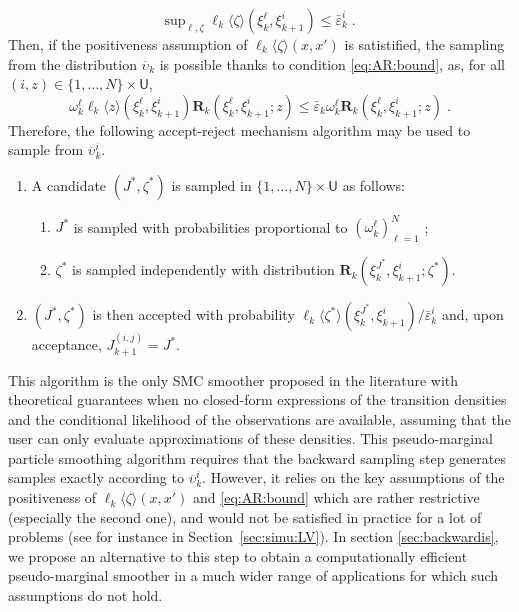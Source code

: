 \documentclass{article}
\newcommand{\N}{N}
\newcommand{\hkup}{\bar{\varepsilon}}
\newcommand{\bi}[3]{J_{#1}^{(#2, #3)}}
\newcommand{\eqsp}{\;}
\newcommand{\ewght}[2]{\ensuremath{\omega_{#1}^{#2}}}
\newcommand{\epart}[2]{\ensuremath{\xi_{#1}^{#2}}}
\newcommand{\marginalset}{\mathsf{U}}
\newcommand{\kernelmarg}{\mathbf{R}}
\newcommand{\qg}[1]{\ell_{#1}}
\newcommand{\hatqg}[1]{\mathsf{\ell}_{#1}}
\begin{document}
\begin{equation}
\mathrm{sup}_{\ell,\zeta}\;\hatqg{k}\langle \zeta\rangle(\epart{k}{\ell},\epart{k+1}{i})\leqslant \hkup^i_k\eqsp. \label{eq:AR:bound}
\end{equation}
Then,  if the positiveness assumption of  $\hatqg{k}\langle \zeta\rangle(x, x')$ is satistified, the sampling from the distribution $\overline\upsilon_k$ is possible thanks to condition \eqref{eq:AR:bound}, as, for all $(i, z) \in \lbrace 1,\dots,N\rbrace\times\marginalset$, 
$$
\ewght{k}{\ell}\hatqg{k}\langle z \rangle(\epart{k}{\ell},\epart{k+1}{i})\kernelmarg_{k}(\epart{k}{\ell},\epart{k+1}{i};z) \leqslant \hkup_k \ewght
{k}{\ell} \kernelmarg_{k}(\epart{k}{\ell},\epart{k+1}{i};z)\eqsp. 
$$
Therefore, the following  accept-reject mechanism algorithm may be used to sample from $\overline \upsilon_k^i$.
\begin{enumerate}
\item A candidate $(J^\ast,\zeta^\ast)$ is sampled in $\{1,\ldots, \N\}\times\marginalset$ as follows: 
\begin{enumerate}
\item $J^\ast$ is sampled with probabilities proportional to  $(\ewght{k}{\ell})_{\ell=1}^{\N}$ ;
\item $\zeta^\ast$ is sampled independently with distribution $\kernelmarg_{k}(\epart{k}{J^\ast},\epart{k+1}{i};\zeta^\ast)$.
\end{enumerate}
\item  $(J^\ast,\zeta^\ast)$ is then accepted with probability $\hatqg{k}\langle \zeta^\ast\rangle(\epart{k}{J^\ast}, \epart{k+1}{i})/\hkup_k^i$ and, upon acceptance, $\bi{k+1}{i}{j} = J^*$.
\end{enumerate}
This algorithm is the only SMC smoother proposed in the literature with  theoretical guarantees when no closed-form expressions of  the  transition  densities and the conditional likelihood of the observations are available,  assuming that the user  can only evaluate  approximations of these densities. 
This pseudo-marginal particle smoothing algorithm  requires that the backward sampling step  generates samples exactly according to $\overline \upsilon_k^i$.  
However, it relies on the key assumptions of the positiveness of $\hatqg{k}\langle \zeta\rangle(x, x')$ and \eqref{eq:AR:bound} which are rather restrictive (especially the second one), and would not be satisfied in practice for a lot of problems (see for instance in Section~\ref{sec:simu:LV}).
 In section \ref{sec:backwardis}, we propose an alternative to this step to obtain a computationally efficient pseudo-marginal smoother in a much wider range of applications for which such assumptions do not hold.
 
\end{document}
